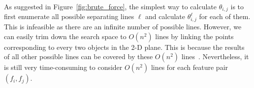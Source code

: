 

 As suggested in Figure~\ref{fig:brute_force}, the simplest way to calculate $\theta_{i,j}$ is to first enumerate all possible separating lines $\ell$ and calculate $\theta_{i,j}^\ell$ for each of them. This is infeasible as there are an infinite number of possible lines. However, we can easily trim down the search space to $O(n^2)$ lines by linking the points corresponding to every two objects in the 2-D plane. This is because the results of all other possible lines can be covered by these $O(n^2)$ lines~\cite{vapnik1998statistical}. Nevertheless, it is still very time-consuming to consider $O(n^2)$ lines for each feature pair $(f_i,f_j)$.

